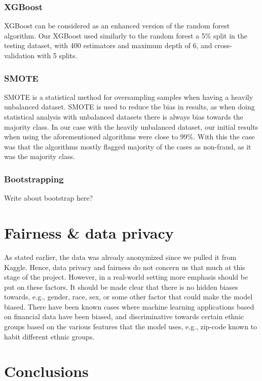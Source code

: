 \documentclass{article}
\begin{document}
\subsubsection{XGBoost}

XGBoost can be considered as an enhanced version of the random forest algorithm. Our XGBoost used similarly to the random forest a 5\% split in the testing dataset, with 400 estimators and maximum depth of 6, and cross-validation with 5 splits.

\subsubsection{SMOTE}

SMOTE is a statistical method for oversampling samples when having a heavily unbalanced dataset. SMOTE is used to reduce the bias in results, as when doing statistical analysis with unbalanced datasets there is always bias towards the majority class. In our case with the heavily unbalanced dataset, our initial results when using the aforementioned algorithms were close to 99\%. With this the case was that the algorithms mostly flagged majority of the cases as non-fraud, as it was the majority class.

\subsubsection{Bootstrapping}

Write about bootstrap here?

\section{Fairness \& data privacy}

As stated earlier, the data was already anonymized since we pulled it from Kaggle. Hence, data privacy and fairness do not concern us that much at this stage of the project. However, in a real-world setting more emphasis should be put on these factors. It should be made clear that there is no hidden biases towards, e.g., gender, race, sex, or some other factor that could make the model biased. There have been known cases where machine learning applications based on financial data have been biased, and discriminative towards certain ethnic groups based on the various features that the model uses, e.g., zip-code known to habit different ethnic groups.

\section{Conclusions}
\end{document}
